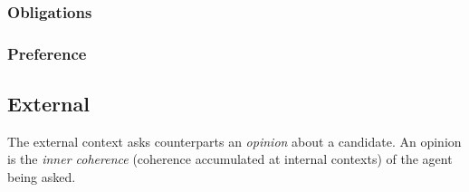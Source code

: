 \subsubsection{Obligations}


\subsubsection{Preference}


\subsection{External}

The external context asks counterparts an \emph{opinion} about a candidate.
An opinion is the \emph{inner coherence} (coherence accumulated at internal
contexts) of the agent being asked.


%


